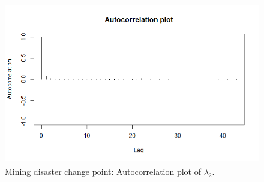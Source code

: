 \begin{figure}[!h]
	\includegraphics[width=340pt, height=200pt]{Chapters/chapter5/figures/AutocorrelationPlot.png}
	\caption[List of figure caption goes here]{ Mining disaster change point: Autocorrelation plot of $\lambda_2$.}\label{fig512}
\end{figure}

